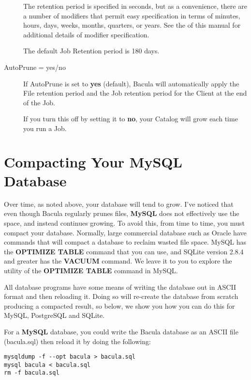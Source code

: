 \begin{description}
The retention period is specified in seconds, but as a convenience, there
are a number of modifiers that permit easy specification in terms of
minutes, hours, days, weeks, months, quarters, or years.  See the  of this manual for additional details of
modifier specification.

The default Job Retention period is 180 days.  

\item [AutoPrune = \lt{}yes/no\gt{}]
   If AutoPrune is set to  {\bf yes} (default), Bacula will  automatically apply
the File retention period and the Job  retention period for the Client at the
end of the Job.  

If you turn this off by setting it to {\bf no}, your  Catalog will grow each
time you run a Job. 
\end{description}

\label{CompactingMySQL}
\section{Compacting Your MySQL Database}

Over time, as noted above, your database will tend to grow. I've noticed that
even though Bacula regularly prunes files, {\bf MySQL} does not effectively
use the space, and instead continues growing. To avoid this, from time to
time, you must compact your database. Normally, large commercial database such
as Oracle have commands that will compact a database to reclaim wasted file
space. MySQL has the {\bf OPTIMIZE TABLE} command that you can use, and SQLite
version 2.8.4 and greater has the {\bf VACUUM} command. We leave it to you to
explore the utility of the {\bf OPTIMIZE TABLE} command in MySQL. 

All database programs have some means of writing the database out in ASCII
format and then reloading it. Doing so will re-create the database from
scratch producing a compacted result, so below, we show you how you can do
this for MySQL, PostgreSQL and SQLite. 

For a {\bf MySQL} database, you could write the Bacula database as an ASCII
file (bacula.sql) then reload it by doing the following: 

\footnotesize
\begin{verbatim}
mysqldump -f --opt bacula > bacula.sql
mysql bacula < bacula.sql
rm -f bacula.sql
\end{verbatim}
\normalsize

